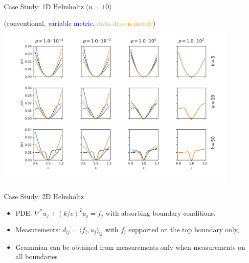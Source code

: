 \documentclass{beamer}
\newcommand{\sU}{\mathsf{U}}
\begin{document}
\begin{frame}{Case Study: 1D Helmholtz ($n=10$)}
  \begin{center}
(conventional, \textcolor{blue}{variable metric}, \textcolor{orange}{data-driven metric})
\includegraphics[width=0.9\textwidth]{../paper/figures/Helmholtz1D_10.png}
  \end{center}
\end{frame}

\begin{frame}{Case Study: 2D Helmholtz}
\begin{itemize}
  \item PDE: $\nabla^2 u_j + (k/c)^2u_j = f_j$ with absorbing boundary conditions,
  \item Measurements: $d_{ij} = \langle f_i, u_j\rangle_\sU$ with $f_i$ supported on the top boundary only,
  \item Grammian can be obtained from measurements only when measurements on all boundaries
\end{itemize}
\end{frame}
\end{document}
